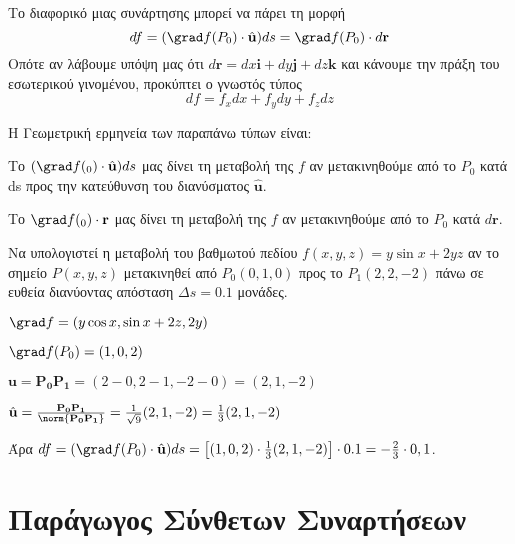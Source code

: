 \documentclass[a4paper,table]{report}
\begin{document}
  Το διαφορικό μιας συνάρτησης μπορεί να πάρει τη μορφή 
  \[
    df = (\grad f(P_{0})\cdot \hat{\mathbf{u}}) ds = \grad f(P_{0})\cdot d \mathbf{r} 
  \] 
  Οπότε αν λάβουμε υπόψη μας ότι $ d \mathbf{r} = dx \mathbf{i}+ dy \mathbf{j}+ dz
  \mathbf{k} $ και κάνουμε την πράξη του εσωτερικού γινομένου, προκύπτει ο γνωστός τύπος
  \[
    df = f_{x}dx + f_{y}dy+ f_{z}dz 
  \]
  \begin{rem}
    Η Γεωμετρική ερμηνεία των παραπάνω τύπων είναι:
    \begin{myitemize}
      \item Το $ (\grad f({_{0}})\cdot \hat{\mathbf{u}})ds $ μας δίνει τη μεταβολή της 
        $f$ αν μετακινηθούμε από το $ P_{0} $ κατά ds προς την κατεύθυνση του
        διανύσματος $ \hat{\mathbf{u}} $.
      \item Το $ \grad f({_{0}})\cdot \mathbf{r} $ μας δίνει τη μεταβολή της 
        $f$ αν μετακινηθούμε από το $ P_{0} $ κατά $ d \mathbf{r} $. 
    \end{myitemize}
  \end{rem}
  \begin{example}
    Να υπολογιστεί η μεταβολή του βαθμωτού πεδίου $ f(x,y,z)= y \sin{x} +2yz $ αν το 
    σημείο $ P(x,y,z) $ μετακινηθεί από $ P_{0}(0,1,0) $ προς το $ P_{1}(2,2,-2) $ πάνω 
    σε ευθεία διανύοντας απόσταση $ \Delta s = 0.1 $ μονάδες.
  \end{example}
  \begin{solution}
  \item {}
    \begin{myitemize}
      \item $ \grad f = (y \cos{x} , \sin{x} +2z, 2y) $
      \item $ \grad f(P_{0}) = (1,0,2) $
      \item $ \mathbf{u} = \mathbf{P_{0}P_{1}} = (2-0,2-1,-2-0) = (2,1,-2) $
      \item $ \hat{\mathbf{u}} = \frac{\mathbf{P_{0}P_{1}}}{\norm{\mathbf{P_{0}P_{1}}}} =
        \frac{1}{\sqrt{9}} (2,1,-2) = \frac{1}{3} (2,1,-2) $
    \end{myitemize}
    Άρα $ df = (\grad f(P_{0})\cdot \hat{\mathbf{u}}) ds = \left[(1,0,2) \cdot
    \frac{1}{3} (2,1,-2)\right]\cdot 0.1 = - \frac{2}{3}\cdot 0,1 $.
  \end{solution}



  \chapter{Παράγωγος Σύνθετων Συναρτήσεων}
\end{document}
